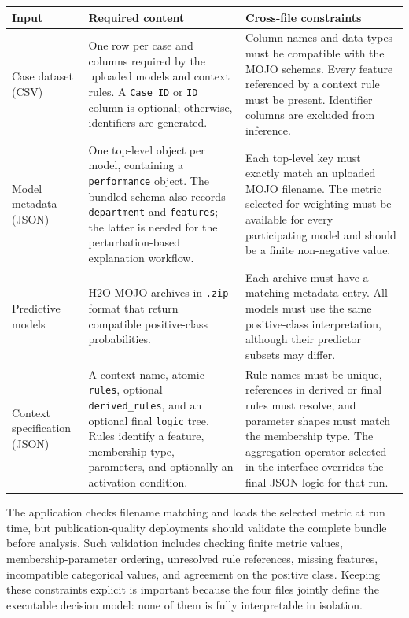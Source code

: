 \documentclass{interact}
\begin{document}
\begin{table}[!tbh]
{\begin{tabularx}{\textwidth}{>{\raggedright\arraybackslash}p{2.6cm} >{\raggedright\arraybackslash}X >{\raggedright\arraybackslash}X}
\toprule
\textbf{Input} & \textbf{Required content} & \textbf{Cross-file constraints} \\
\midrule
Case dataset (CSV) &
One row per case and columns required by the uploaded models and context rules. A \texttt{Case\_ID} or \texttt{ID} column is optional; otherwise, identifiers are generated. &
Column names and data types must be compatible with the MOJO schemas. Every feature referenced by a context rule must be present. Identifier columns are excluded from inference. \\
\addlinespace
Model metadata (JSON) &
One top-level object per model, containing a \texttt{performance} object. The bundled schema also records \texttt{department} and \texttt{features}; the latter is needed for the perturbation-based explanation workflow. &
Each top-level key must exactly match an uploaded MOJO filename. The metric selected for weighting must be available for every participating model and should be a finite non-negative value. \\
\addlinespace
Predictive models &
H2O MOJO archives in \texttt{.zip} format that return compatible positive-class probabilities. &
Each archive must have a matching metadata entry. All models must use the same positive-class interpretation, although their predictor subsets may differ. \\
\addlinespace
Context specification (JSON) &
A context name, atomic \texttt{rules}, optional \texttt{derived\_rules}, and an optional final \texttt{logic} tree. Rules identify a feature, membership type, parameters, and optionally an activation condition. &
Rule names must be unique, references in derived or final rules must resolve, and parameter shapes must match the membership type. The aggregation operator selected in the interface overrides the final JSON logic for that run. \\
\bottomrule
\end{tabularx}}
\label{tab:input_contract}
\end{table}

The application checks filename matching and loads the selected metric at run time, but publication-quality deployments should validate the complete bundle before analysis. Such validation includes checking finite metric values, membership-parameter ordering, unresolved rule references, missing features, incompatible categorical values, and agreement on the positive class. Keeping these constraints explicit is important because the four files jointly define the executable decision model: none of them is fully interpretable in isolation.
\end{document}
